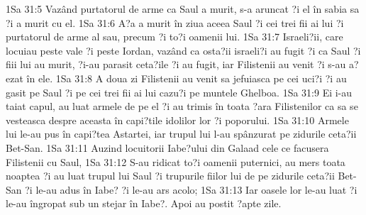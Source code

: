 1Sa 31:5  Vazând purtatorul de arme ca Saul a murit, s-a aruncat ?i el în sabia sa ?i a murit cu el.
1Sa 31:6  A?a a murit în ziua aceea Saul ?i cei trei fii ai lui ?i purtatorul de arme al sau, precum ?i to?i oamenii lui.
1Sa 31:7  Israeli?ii, care locuiau peste vale ?i peste Iordan, vazând ca osta?ii israeli?i au fugit ?i ca Saul ?i fiii lui au murit, ?i-au parasit ceta?ile ?i au fugit, iar Filistenii au venit ?i s-au a?ezat în ele.
1Sa 31:8  A doua zi Filistenii au venit sa jefuiasca pe cei uci?i ?i au gasit pe Saul ?i pe cei trei fii ai lui cazu?i pe muntele Ghelboa.
1Sa 31:9  Ei i-au taiat capul, au luat armele de pe el ?i au trimis în toata ?ara Filistenilor ca sa se vesteasca despre aceasta în capi?tile idolilor lor ?i poporului.
1Sa 31:10  Armele lui le-au pus în capi?tea Astartei, iar trupul lui l-au spânzurat pe zidurile ceta?ii Bet-San.
1Sa 31:11  Auzind locuitorii Iabe?ului din Galaad cele ce facusera Filistenii cu Saul,
1Sa 31:12  S-au ridicat to?i oamenii puternici, au mers toata noaptea ?i au luat trupul lui Saul ?i trupurile fiilor lui de pe zidurile ceta?ii Bet-San ?i le-au adus în Iabe? ?i le-au ars acolo;
1Sa 31:13  Iar oasele lor le-au luat ?i le-au îngropat sub un stejar în Iabe?. Apoi au postit ?apte zile.


